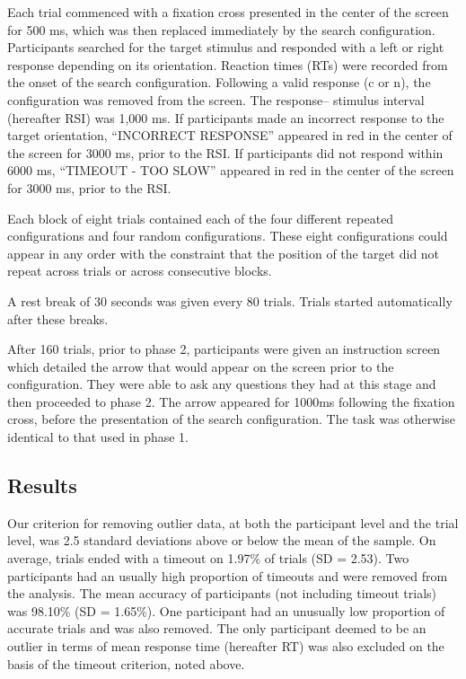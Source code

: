 \documentclass[
  man,floatsintext]{apa7}
\begin{document}
Each trial commenced with a fixation cross presented in the center of the screen for 500 ms, which was then replaced immediately by the search configuration. Participants searched for the target stimulus and responded with a left or right response depending on its orientation. Reaction times (RTs) were recorded from the onset of the search configuration. Following a valid response (c or n), the configuration was removed from the screen. The response-- stimulus interval (hereafter RSI) was 1,000 ms. If participants made an incorrect response to the target orientation, ``INCORRECT RESPONSE'' appeared in red in the center of the screen for 3000 ms, prior to the RSI. If participants did not respond within 6000 ms, ``TIMEOUT - TOO SLOW'' appeared in red in the center of the screen for 3000 ms, prior to the RSI.

Each block of eight trials contained each of the four different repeated configurations and four random configurations. These eight configurations could appear in any order with the constraint that the position of the target did not repeat across trials or across consecutive blocks.

A rest break of 30 seconds was given every 80 trials. Trials started automatically after these breaks.

After 160 trials, prior to phase 2, participants were given an instruction screen which detailed the arrow that would appear on the screen prior to the configuration. They were able to ask any questions they had at this stage and then proceeded to phase 2. The arrow appeared for 1000ms following the fixation cross, before the presentation of the search configuration. The task was otherwise identical to that used in phase 1.

\hypertarget{results}{%
\subsection{Results}\label{results}}

Our criterion for removing outlier data, at both the participant level and the trial level, was 2.5 standard deviations above or below the mean of the sample. On average, trials ended with a timeout on 1.97\% of trials (SD = 2.53). Two participants had an usually high proportion of timeouts and were removed from the analysis. The mean accuracy of participants (not including timeout trials) was 98.10\% (SD = 1.65\%). One participant had an unusually low proportion of accurate trials and was also removed. The only participant deemed to be an outlier in terms of mean response time (hereafter RT) was also excluded on the basis of the timeout criterion, noted above.
\end{document}
